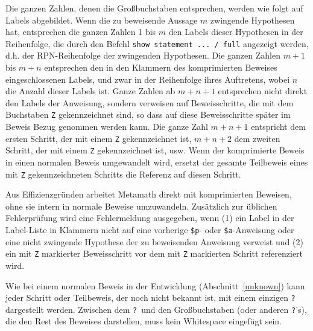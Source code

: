 Die ganzen Zahlen, denen die Großbuchstaben entsprechen, werden wie folgt auf Labels abgebildet.  Wenn die zu beweisende Aussage $m$ zwingende Hypothesen hat, entsprechen die ganzen Zahlen 1 bis $m$ den Labels dieser Hypothesen in der Reihenfolge, die durch den Befehl \texttt{show statement ... / full} angezeigt werden, d.h. der RPN-Reihenfolge der zwingenden Hypothesen.  Die ganzen Zahlen $m+1$ bis $m+n$ entsprechen den in den Klammern des komprimierten Beweises eingeschlossenen Labels, und zwar in der Reihenfolge ihres Auftretens, wobei $n$ die Anzahl dieser Labels ist.  Ganze Zahlen ab $m+n+1$ entsprechen nicht direkt den Labels der Anweisung, sondern verweisen auf Beweisschritte, die mit dem Buchstaben \texttt{Z} gekennzeichnet sind, so dass auf diese Beweisschritte später im Beweis Bezug genommen werden kann.  Die ganze Zahl $m+n+1$ entspricht dem ersten Schritt, der mit einem \texttt{Z} gekennzeichnet ist, $m+n+2$ dem zweiten Schritt, der mit einem \texttt{Z} gekennzeichnet ist, usw.  Wenn der komprimierte Beweis in einen normalen Beweis umgewandelt wird, ersetzt der gesamte Teilbeweis eines mit \texttt{Z} gekennzeichneten Schritts die Referenz auf diesen Schritt. 

Aus Effizienzgründen arbeitet Metamath direkt mit komprimierten Beweisen, ohne sie intern in normale Beweise umzuwandeln.  Zusätzlich zur üblichen Fehlerprüfung wird eine Fehlermeldung ausgegeben, wenn (1) ein Label in der Label-Liste in Klammern nicht auf eine vorherige \texttt{\$p}- oder \texttt{\$a}-Anweisung oder eine nicht zwingende Hypothese der zu beweisenden Anweisung verweist und (2) ein mit \texttt{Z} markierter Beweisschritt vor dem mit \texttt{Z} markierten Schritt referenziert wird. 

Wie bei einem normalen Beweis in der Entwicklung (Abschnitt~\ref{unknown}) kann jeder Schritt oder Teilbeweis, der noch nicht bekannt ist, mit einem einzigen \texttt{?} dargestellt werden. Zwischen dem \texttt{?}\ und den Großbuchstaben (oder anderen \texttt{?}'s), die den Rest des Beweises darstellen, muss kein Whitespace eingefügt sein. 

